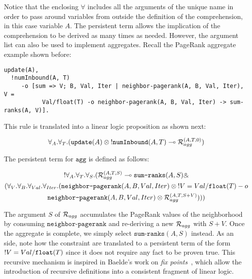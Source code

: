 Notice that the enclosing $\forall$ includes all the arguments of the unique
name in order to pass around variables from outside the definition of the
comprehension, in this case variable $A$. The persistent term allows the
implication of the comprehension to be derived as many times as needed.
However, the argument list can also be used to implement aggregates.  Recall the
PageRank aggregate example shown before:

\begin{Verbatim}[fontsize=\codesize]
  update(A),
  !numInbound(A, T)
     -o [sum => V; B, Val, Iter | neighbor-pagerank(A, B, Val, Iter), V =
           Val/float(T) -o neighbor-pagerank(A, B, Val, Iter) -> sum-ranks(A, V)].
\end{Verbatim}

This rule is translated into a linear logic proposition as shown next:

\begin{align}
\forall_{A}. \forall_{T}. (\texttt{update}(A) \otimes {!} \texttt{numInbound}(A, T) \multimap
\mathcal{R}_{agg}^{(A, T, 0)})
\end{align}

The persistent term for $\texttt{agg}$ is defined as follows:

\begin{multline}
{!} \forall_A. \forall_T. \forall_S. (\mathcal{R}_{agg}^{(A, T, S)} \multimap \texttt{sum-ranks}(A, S) \mathbin{\binampersand}\\
(\forall_V. \forall_B. \forall_{Val}. \forall_{Iter}.
   (\texttt{neighbor-pagerank}(A, B, Val, Iter) \otimes {!} V = Val/\texttt{float}(T) -o \\\texttt{neighbor-pagerank}(A, B, Val, Iter) \otimes \mathcal{R}_{agg}^{(A, T, S + V)})))
\end{multline}

The argument $S$ of $\mathcal{R}_{agg}$ accumulates the PageRank values of the
neighborhood by consuming $\texttt{neighbor-pagerank}$ and re-deriving a new
$\mathcal{R}_{agg}$ with $S + V$. Once the aggregate is complete, we simply select
$\texttt{sum-ranks}(A, S)$ instead. As an side, note how the constraint are
translated to a persistent term of the form ${!} V = Val/\texttt{float}(T)$
since it does not require any fact to be proven true. This recursive mechanism
is inspired in Baelde's work on \emph{fix points}~\cite{BaeldeM07,Baelde:2012}, which allow
the introduction of recursive definitions into a consistent fragment of linear
logic.
